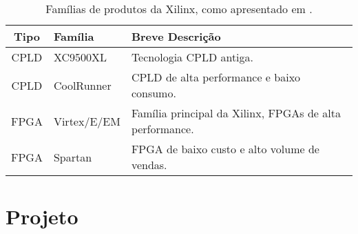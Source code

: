 \documentclass[11pt,a4paper,oneside]{book}
\begin{document}
\begin{table}[h]
\centering
\begin{tabular}{|c|l|p{6.5cm}|}
\hline
Tipo & Fam\'i­lia & Breve Descri\c{c}\~ao \\ \hline
CPLD & XC9500XL & Tecnologia CPLD antiga. \\ \hline
CPLD & CoolRunner & CPLD de alta performance e baixo consumo. \\ \hline
FPGA & Virtex/E/EM & Fam\'i­lia principal da Xilinx, FPGAs de alta performance. \\ \hline
FPGA & Spartan & FPGA de baixo custo e alto volume de vendas. \\ \hline
\end{tabular}
\caption{Fam\'i­lias de produtos da Xilinx, como apresentado em \cite{Woods2008}.}
\label{tab:xilinx}
\end{table}


\section{Projeto}
\label{sec:projeto}


\ifx\compilewholereport\undefined
	 
	\newsavebox\mytempbib\savebox\mytempbib{\parbox{\textwidth}{}}

	
\end{document}
